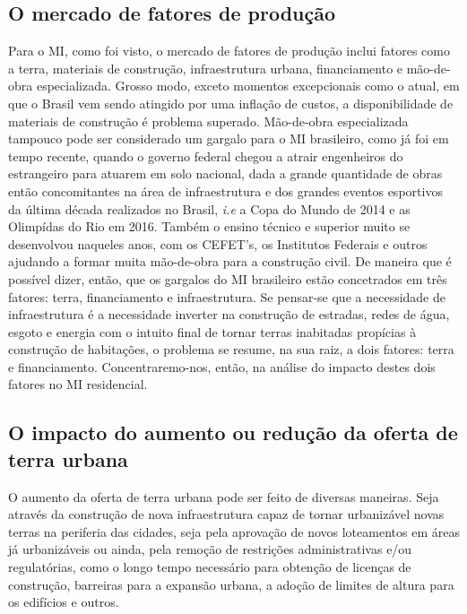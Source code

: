 \documentclass[
	12pt,				%
	oneside,			%
	a4paper,			%
	chapter=TITLE,		%
	section=TITLE,		%
	english,			%
	brazil				%
	]{abntex2}
\begin{document}
\begin{refsection}
\hypertarget{o-mercado-de-fatores-de-produuxe7uxe3o}{%
\section{O mercado de fatores de produção}\label{o-mercado-de-fatores-de-produuxe7uxe3o}}

Para o \gls{MI}, como foi visto, o mercado de fatores de produção inclui fatores
como a terra, materiais de construção, infraestrutura urbana, financiamento e
mão-de-obra especializada. Grosso modo, exceto momentos excepcionais como o
atual, em que o Brasil vem sendo atingido por uma inflação de custos, a
disponibilidade de materiais de construção é problema superado. Mão-de-obra
especializada tampouco pode ser considerado um gargalo para o \gls{MI}
brasileiro, como já foi em tempo recente, quando o governo federal chegou a
atrair engenheiros do estrangeiro para atuarem em solo nacional, dada a grande
quantidade de obras então concomitantes na área de infraestrutura e dos grandes
eventos esportivos da última década realizados no Brasil, \emph{i.e} a Copa do Mundo
de 2014 e as Olimpídas do Rio em 2016. Também o ensino técnico e superior muito
se desenvolvou naqueles anos, com os CEFET's, os Institutos Federais e outros
ajudando a formar muita mão-de-obra para a construção civil. De maneira que é
possível dizer, então, que os gargalos do \gls{MI} brasileiro estão concetrados
em três fatores: terra, financiamento e infraestrutura. Se pensar-se que a
necessidade de infraestrutura é a necessidade inverter na construção de estradas,
redes de água, esgoto e energia com o intuito final de tornar terras inabitadas
propícias à construção de habitações, o problema se resume, na sua raiz, a dois
fatores: terra e financiamento. Concentraremo-nos, então, na análise do impacto
destes dois fatores no \gls{MI} residencial.

\hypertarget{o-impacto-do-aumento-ou-reduuxe7uxe3o-da-oferta-de-terra-urbana}{%
\subsection{O impacto do aumento ou redução da oferta de terra urbana}\label{o-impacto-do-aumento-ou-reduuxe7uxe3o-da-oferta-de-terra-urbana}}

O aumento da oferta de terra urbana pode ser feito de diversas maneiras. Seja
através da construção de nova infraestrutura capaz de tornar urbanizável novas
terras na periferia das cidades, seja pela aprovação de novos loteamentos em
áreas já urbanizáveis ou ainda, pela remoção de restrições administrativas e/ou
regulatórias, como o longo tempo necessário para obtenção de licenças de
construção, barreiras para a expansão urbana, a adoção de limites de altura para
os edifícios e outros.


\end{refsection}
\end{document}
